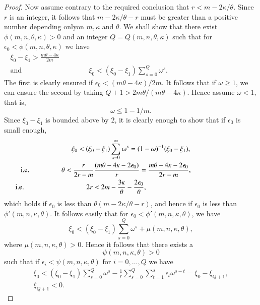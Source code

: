 \begin{proof}
Now assume contrary to the required conclusion that $r<m-2\kappa/\theta$. 
Since $r$ is an integer, it follows that $m-2\kappa/\theta-r$ must be 
greater than a positive number depending only\pageoriginale on $m,\kappa$ 
and $\theta$. We shall show that there exist $\phi(m,n,\theta,\kappa)>0$ 
and an integer $Q=Q(m,n,\theta,\kappa)$ such that for $\epsilon_0<\phi 
(m,n,\theta,\kappa)$ we have 
\begin{gather*}
\xi_0-\xi_1>\frac{m\theta-4\kappa}{2m}\\
\text{and}\hspace{4cm} \xi_0<(\xi_0-\xi_1)\sum\limits_{s=0}^Q 
\omega^s.\hspace{5cm}  
\end{gather*}
The first is clearly ensured if $\epsilon_0<(m\theta-4\kappa)/2m$. It 
follows that if $\omega\geq 1$, we can ensure the second by taking 
$Q+1> 2m\theta/(m\theta-4\kappa)$. Hence assume $\omega<1$, that is, 
$$
\omega\leq 1-1/m.
$$
Since $\xi_0-\xi_1$ is bounded above by $2$, it is clearly enough to 
show that if $\epsilon_0$ is small enough,
\begin{gather*}
\xi_0<(\xi_0-\xi_1)\sum\limits_{s=0}^\infty\omega^s=(1-\omega)^{-1} 
(\xi_0-\xi_1),\\
\text{\ie}\hspace{1.5cm} 
\theta<\frac{r}{2r-m}\frac{(m\theta-4\kappa-2\epsilon_0)}{r}=\frac{m\theta- 
4\kappa-2\epsilon_0}{2r-m},\hspace{2.5cm}\\  
\text{\ie}\hspace{3cm} 
2r<2m-\frac{3\kappa}{\theta}-\frac{2\epsilon_0}{\theta},\hspace{5cm}
\end{gather*}
which holds if $\epsilon_0$ is less than $\theta(m-2\kappa/\theta-r)$, and 
hence if $\epsilon_0$ is less than $\phi'(m,n,\kappa,\theta)$. It follows 
easily that for $\epsilon_0<\phi'(m,n,\kappa,\theta)$, we have 
$$
\xi_0<(\xi_0-\xi_1)\sum\limits_{s=0}^Q\omega^s+\mu(m,n,\kappa,\theta),
$$
where $\mu(m,n,\kappa,\theta)>0$. Hence it follows that there exists a 
$$
\psi(m,n,\kappa,\theta)>0
$$ 
such that if $\epsilon_i<\psi(m,n,\kappa,\theta)$ 
for $i=0,\ldots,Q$ we have 
\begin{gather*}
\xi_0<(\xi_0-\xi_1)\sum\limits_{s=0}^Q\omega^s-\tfrac{1}{r} 
\sum\limits_{s=0}^Q\sum\limits_{t=1}^s\epsilon_t\omega^{s-t}=\xi_0 
-\xi_{Q+1},\\
\xi_{Q+1}<0.
\end{gather*}


\end{proof}
